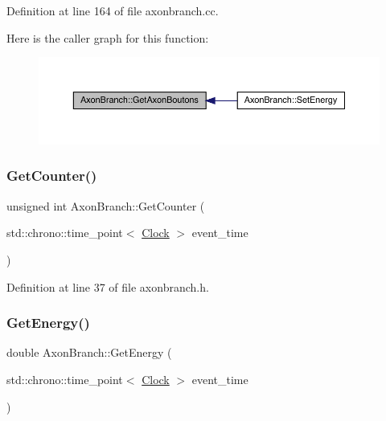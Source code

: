 Definition at line 164 of file axonbranch.\+cc.

Here is the caller graph for this function\+:
\nopagebreak
\begin{figure}[H]
\begin{center}
\leavevmode
\includegraphics[width=350pt]{class_axon_branch_aafadba57924686a8087c7f7758889045_icgraph}
\end{center}
\end{figure}
\mbox{\label{class_axon_branch_a1d2404b68ec2d18a814c96a7c04c5fc4}} 
\subsubsection{\texorpdfstring{Get\+Counter()}{GetCounter()}}
{\footnotesize\ttfamily unsigned int Axon\+Branch\+::\+Get\+Counter (\begin{DoxyParamCaption}\item[{std\+::chrono\+::time\+\_\+point$<$ \hyperlink{universe_8h_a0ef8d951d1ca5ab3cfaf7ab4c7a6fd80}{Clock} $>$}]{event\+\_\+time }\end{DoxyParamCaption})\hspace{0.3cm}{\ttfamily [inline]}}



Definition at line 37 of file axonbranch.\+h.

\mbox{\label{class_axon_branch_a688ec51cd5116e9aebe9b4d3c5c7f2b1}} 
\subsubsection{\texorpdfstring{Get\+Energy()}{GetEnergy()}}
{\footnotesize\ttfamily double Axon\+Branch\+::\+Get\+Energy (\begin{DoxyParamCaption}\item[{std\+::chrono\+::time\+\_\+point$<$ \hyperlink{universe_8h_a0ef8d951d1ca5ab3cfaf7ab4c7a6fd80}{Clock} $>$}]{event\+\_\+time }\end{DoxyParamCaption})\hspace{0.3cm}{\ttfamily [inline]}}



